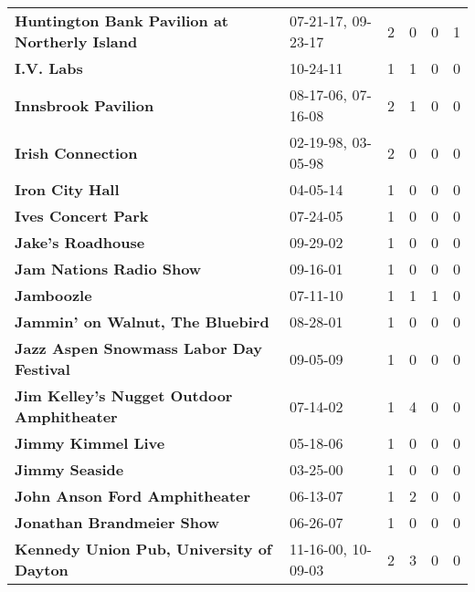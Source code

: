 \begin{supertabular}{p{0.4\textwidth}p{0.3\textwidth}p{0.05\textwidth}p{0.05\textwidth}p{0.05\textwidth}p{0.05\textwidth}}
                \textbf{Huntington Bank Pavilion at Northerly Island} &  07-21-17, 09-23-17 &  2 &  0 &  0 &  1 \\
                                                   \textbf{I.V. Labs} &            10-24-11 &  1 &  1 &  0 &  0 \\
                                          \textbf{Innsbrook Pavilion} &  08-17-06, 07-16-08 &  2 &  1 &  0 &  0 \\
                                            \textbf{Irish Connection} &  02-19-98, 03-05-98 &  2 &  0 &  0 &  0 \\
                                              \textbf{Iron City Hall} &            04-05-14 &  1 &  0 &  0 &  0 \\
                                           \textbf{Ives Concert Park} &            07-24-05 &  1 &  0 &  0 &  0 \\
                                            \textbf{Jake's Roadhouse} &            09-29-02 &  1 &  0 &  0 &  0 \\
                                      \textbf{Jam Nations Radio Show} &            09-16-01 &  1 &  0 &  0 &  0 \\
                                                   \textbf{Jamboozle} &            07-11-10 &  1 &  1 &  1 &  0 \\
                             \textbf{Jammin' on Walnut, The Bluebird} &            08-28-01 &  1 &  0 &  0 &  0 \\
                      \textbf{Jazz Aspen Snowmass Labor Day Festival} &            09-05-09 &  1 &  0 &  0 &  0 \\
                    \textbf{Jim Kelley's Nugget Outdoor Amphitheater} &            07-14-02 &  1 &  4 &  0 &  0 \\
                                           \textbf{Jimmy Kimmel Live} &            05-18-06 &  1 &  0 &  0 &  0 \\
                                               \textbf{Jimmy Seaside} &            03-25-00 &  1 &  0 &  0 &  0 \\
                                \textbf{John Anson Ford Amphitheater} &            06-13-07 &  1 &  2 &  0 &  0 \\
                                    \textbf{Jonathan Brandmeier Show} &            06-26-07 &  1 &  0 &  0 &  0 \\
                     \textbf{Kennedy Union Pub, University of Dayton} &  11-16-00, 10-09-03 &  2 &  3 &  0 &  0 \\

\end{supertabular}

